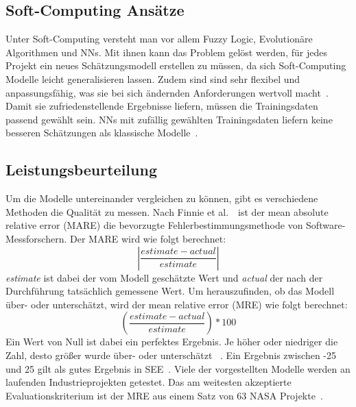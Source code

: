 \subsection{Soft-Computing Ansätze}
Unter Soft-Computing versteht man vor allem Fuzzy Logic, Evolutionäre Algorithmen und NNs. Mit ihnen kann das Pro\-blem gelöst werden, für jedes Projekt ein neues Schätzungsmodell erstellen zu müssen, da sich Soft-Computing Modelle leicht generalisieren lassen. Zudem sind sind sehr flexibel und anpassungsfähig, was sie bei sich ändernden Anforderungen wertvoll macht~\cite{Boetticher2001}. Damit sie zufriedenstellende Ergebnisse liefern, müssen die Trainingsdaten passend gewählt sein. NNs mit zufällig gewählten Trainingsdaten liefern keine besseren Schätzungen als klassische Modelle~\cite{Setyawati2002}.
\\
\subsection{Leistungsbeurteilung}
Um die Modelle untereinander vergleichen zu können, gibt es verschiedene Methoden die Qualität zu messen. Nach Finnie et al.~\cite{Finnie1996}~ist der mean absolute relative error (MARE) die bevorzugte Fehlerbestimmungsmethode von Software-Messforschern. Der MARE wird wie folgt berechnet:
\begin{equation}
\left|\frac{estimate - actual}{estimate}\right|
\end{equation}
\textit{estimate} ist dabei der vom Modell geschätzte Wert und \textit{actual} der nach der Durchführung tatsächlich gemessene Wert. Um herauszufinden, ob das Modell über- oder unterschätzt, wird der mean relative error (MRE) wie folgt berechnet:
\begin{equation}
\left(\frac{estimate - actual}{estimate}\right)*100
\end{equation}
Ein Wert von Null ist dabei ein perfektes Ergebnis. Je höher oder niedriger die Zahl, desto größer wurde über- oder unterschätzt ~\cite{Finnie1996}. Ein Ergebnis zwi\-schen -25 und 25 gilt als gutes Ergebnis in SEE~\cite{Abrahamsson2007}. Viele der vorgestellten Modelle werden an laufenden Industrieprojekten getestet. Das am weitesten akzeptierte Evaluationskriterium ist der MRE aus einem Satz von 63 NASA Projekte~\cite{Khalifelu2012}.
\vspace{3.0cm}
